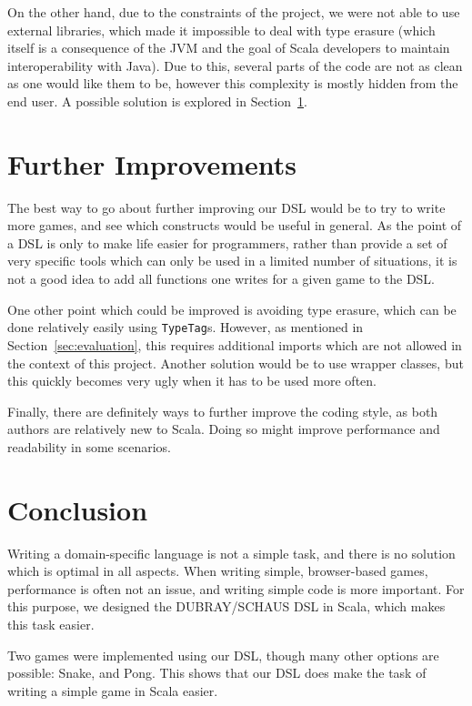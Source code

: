 \documentclass[journal,onecolumn]{IEEEtran}
\theoremstyle{definition}
\newcommand{\scala}[1]{\texttt{#1}}
\begin{document}
On the other hand, due to the constraints of the project, we were not able to use external libraries, which made it impossible to deal with type erasure (which itself is a consequence of the JVM and the goal of Scala developers to maintain interoperability with Java).
Due to this, several parts of the code are not as clean as one would like them to be, however this complexity is mostly hidden from the end user.
A possible solution is explored in Section~\ref{sec:improvements}.

\section{Further Improvements}
\label{sec:improvements}
The best way to go about further improving our DSL would be to try to write more games, and see which constructs would be useful in general.
As the point of a DSL is only to make life easier for programmers, rather than provide a set of very specific tools which can only be used in a limited number of situations, it is not a good idea to add all functions one writes for a given game to the DSL.

One other point which could be improved is avoiding type erasure, which can be done relatively easily using \scala{TypeTag}s.
However, as mentioned in Section~\ref{sec:evaluation}, this requires additional imports which are not allowed in the context of this project.
Another solution would be to use wrapper classes, but this quickly becomes very ugly when it has to be used more often.

Finally, there are definitely ways to further improve the coding style, as both authors are relatively new to Scala.
Doing so might improve performance and readability in some scenarios.


\section{Conclusion}
Writing a domain-specific language is not a simple task, and there is no solution which is optimal in all aspects.
When writing simple, browser-based games, performance is often not an issue, and writing simple code is more important.
For this purpose, we designed the DUBRAY/SCHAUS DSL in Scala, which makes this task easier.

Two games were implemented using our DSL, though many other options are possible: Snake, and Pong.
This shows that our DSL does make the task of writing a simple game in Scala easier.

\end{document}
